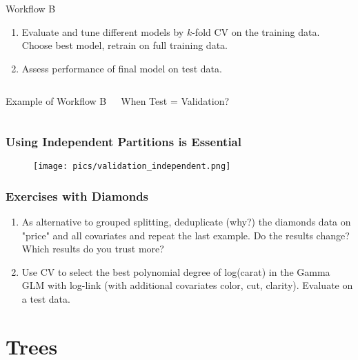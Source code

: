\documentclass[
    utf8,
    aspectratio=169
]{beamer}  %
\begin{document}
\begin{frame}
\begin{columns}[onlytextwidth]
\begin{block}{Workflow B}
\begin{footnotesize}
\begin{enumerate}
					e.g., by ratios 90\%/10\%.
					\item Evaluate and tune different models by $k$-fold CV on the training data. Choose best model, retrain on full training data.
					\item Assess performance of final model on test data.
				\end{enumerate}
			\end{footnotesize}
		\end{block}
	\end{columns}

	\begin{columns}
		\begin{exampleblock}{Example of Workflow B}
		\end{exampleblock}
	
		\alert{When Test = Validation?}
	\end{columns}
\end{frame}

\begin{frame}
	\frametitle{Using Independent Partitions is Essential}
	\begin{figure}
		\texttt{[image: pics/validation\_independent.png]}
	\end{figure}
\end{frame}

\begin{frame}
	\frametitle{Exercises with Diamonds}
	\begin{enumerate}
		\item As alternative to grouped splitting, deduplicate (why?) the diamonds data on "price" and all covariates and repeat the last example. Do the results change? Which results do you trust more?
		
		\vfill
		
		\item Use CV to select the best polynomial degree of log(carat) in the Gamma GLM with log-link (with additional covariates color, cut, clarity). Evaluate on a test data.
	\end{enumerate}
\end{frame}

\section{Trees}
\end{document}
